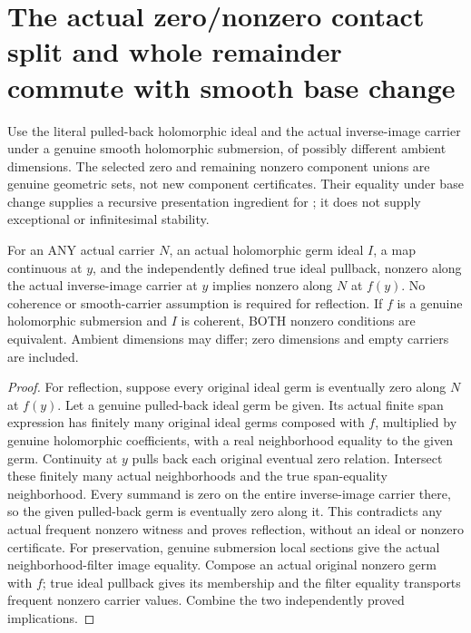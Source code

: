 \section{The actual zero/nonzero contact split and whole remainder commute with smooth base change}

Use the literal pulled-back holomorphic ideal and the actual inverse-image
carrier under a genuine smooth holomorphic submersion, of possibly different
ambient dimensions. The selected zero and remaining nonzero component unions
are genuine geometric sets, not new component certificates. Their equality
under base change supplies a recursive presentation ingredient for
\cite[Section 7]{bierstone-milman08-functoriality}; it does not supply
exceptional or infinitesimal stability.

\begin{theorem}
\label{hir:actual-contact-nonzero-smooth-pullback-iff}
\leanok
For an ANY actual carrier $N$, an actual holomorphic germ ideal $I$, a
map continuous at $y$, and the independently defined true ideal pullback,
nonzero along the actual inverse-image carrier at $y$ implies nonzero
along $N$ at $f(y)$. No coherence or smooth-carrier assumption is required
for reflection. If $f$ is a genuine holomorphic submersion and $I$ is
coherent, BOTH nonzero conditions are equivalent. Ambient dimensions may
differ; zero dimensions and empty carriers are included.
\end{theorem}
\begin{proof}
For reflection, suppose every original ideal germ is eventually zero along
$N$ at $f(y)$. Let a genuine pulled-back ideal germ be given. Its actual
finite span expression has finitely many original ideal germs composed
with $f$, multiplied by genuine holomorphic coefficients, with a real
neighborhood equality to the given germ. Continuity at $y$ pulls back each
original eventual zero relation. Intersect these finitely many actual
neighborhoods and the true span-equality neighborhood. Every summand is
zero on the entire inverse-image carrier there, so the given pulled-back
germ is eventually zero along it. This contradicts any actual frequent
nonzero witness and proves reflection, without an ideal or nonzero
certificate. For preservation, genuine submersion local sections give the
actual neighborhood-filter image equality. Compose an actual original
nonzero germ with $f$; true ideal pullback gives its membership and the
filter equality transports frequent nonzero carrier values. Combine the
two independently proved implications.
\end{proof}

